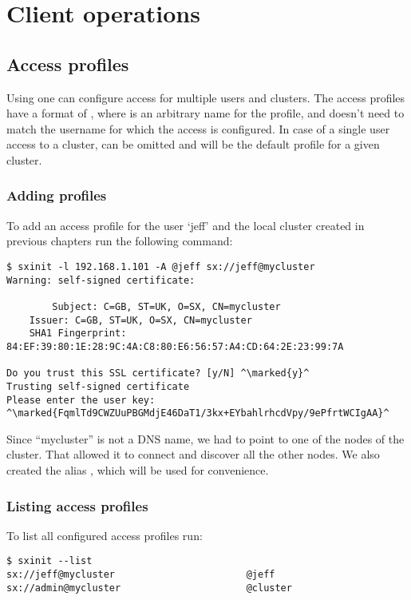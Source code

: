 \chapter{Client operations}

\section{Access profiles}
\label{sec:profiles}
Using  one can configure access for multiple users
and clusters. The access profiles have a format of
, where 
is an arbitrary name for the profile, and doesn't need to match
the username for which the access is configured. In case of a single
user access to a cluster,  can be omitted and
 will be the default profile for a given
cluster.

\subsection{Adding profiles}
To add an access profile for the user `jeff' and the local cluster
created in previous chapters run the following command:
\begin{lstlisting}
$ sxinit -l 192.168.1.101 -A @jeff sx://jeff@mycluster
Warning: self-signed certificate:

        Subject: C=GB, ST=UK, O=SX, CN=mycluster
	Issuer: C=GB, ST=UK, O=SX, CN=mycluster
	SHA1 Fingerprint: 84:EF:39:80:1E:28:9C:4A:C8:80:E6:56:57:A4:CD:64:2E:23:99:7A

Do you trust this SSL certificate? [y/N] ^\marked{y}^
Trusting self-signed certificate
Please enter the user key: ^\marked{FqmlTd9CWZUuPBGMdjE46DaT1/3kx+EYbahlrhcdVpy/9ePfrtWCIgAA}^
\end{lstlisting}
Since ``mycluster'' is not a DNS name, we had to point  
to one of the nodes of the cluster. That allowed it to connect and
discover all the other nodes. We also created the alias ,
which will be used for convenience.

\subsection{Listing access profiles}
To list all configured access profiles run:
\begin{lstlisting}
$ sxinit --list
sx://jeff@mycluster                       @jeff
sx://admin@mycluster                      @cluster
\end{lstlisting}


